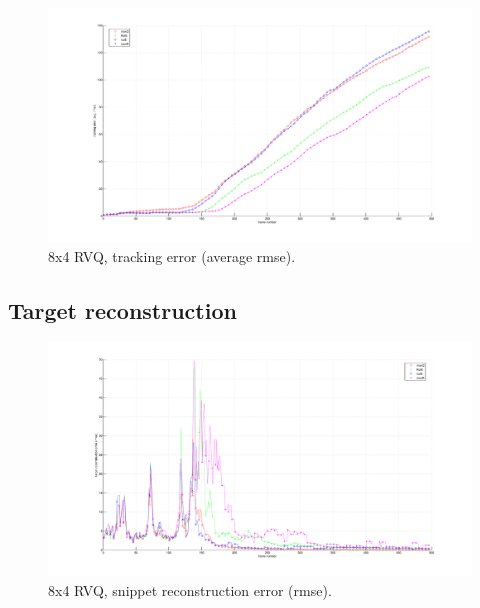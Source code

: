 								\begin{figure}[h!]
								\centering
								\includegraphics[height=0.38\textheight]{thesis/4_trellis70_8_4_1000_trk_armse.pdf}
								\caption{8x4 RVQ, tracking error (average rmse).}
								\label{fig:4_trellis70_8_4_1000_trk_avg_rmse}
								\end{figure}

\clearpage
\newpage
\subsection{Target reconstruction}

								\begin{figure}[h!]
								\centering
								\includegraphics[height=0.4\textheight]{thesis/4_trellis70_8_4_1000_snp_rmse.pdf}
								\caption{8x4 RVQ, snippet reconstruction error (rmse).}
								\label{fig:4_trellis70_8_4_1000_snp_rmse}
								\end{figure}


